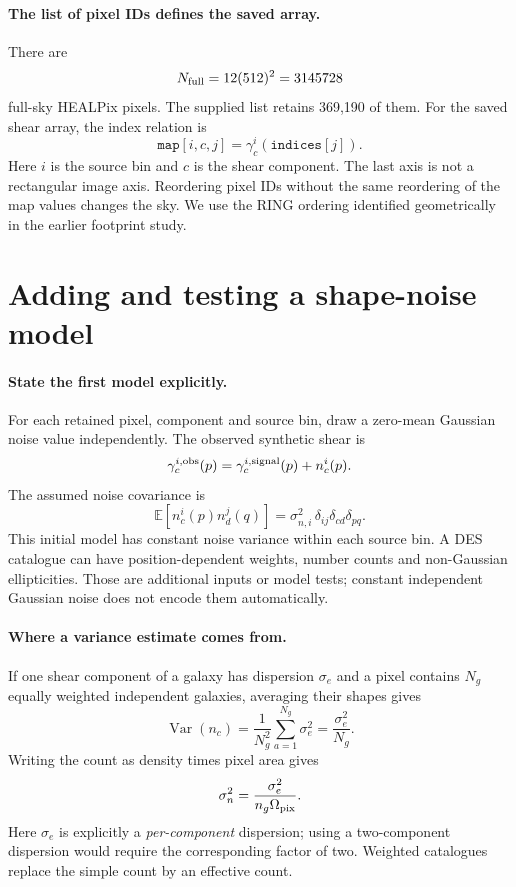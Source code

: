 \documentclass[11pt]{article}
\newcommand{\E}{\mathbb E}
\newcommand{\Var}{\operatorname{Var}}
\begin{document}
\paragraph{The list of pixel IDs defines the saved array.}
There are
\begin{equation}
 N_{\rm full}=12(512)^2=3145728
\end{equation}
full-sky HEALPix pixels. The supplied list retains 369,190 of them.
For the saved shear array, the index relation is
\begin{equation}
 \texttt{map}[i,c,j]=\gamma_c^i(\texttt{indices}[j]).
\end{equation}
Here $i$ is the source bin and $c$ is the shear component. The last
axis is not a rectangular image axis. Reordering pixel IDs without the
same reordering of the map values changes the sky. We use the RING ordering
identified geometrically in the earlier footprint study.

\section{Adding and testing a shape-noise model}
\paragraph{State the first model explicitly.}
For each retained pixel, component and source bin, draw a zero-mean
Gaussian noise value independently. The observed synthetic shear is
\begin{equation}
 \gamma^{i,\rm obs}_c(p)=\gamma^{i,\rm signal}_c(p)+n^i_c(p).
\end{equation}
The assumed noise covariance is
\begin{equation}
 \E[n^i_c(p)n^j_d(q)]=\sigma_{n,i}^2\,
                \delta_{ij}\delta_{cd}\delta_{pq}.
\end{equation}
This initial model has constant noise variance within each source bin.
A DES catalogue can have position-dependent weights, number counts and
non-Gaussian ellipticities. Those are additional inputs or model tests;
constant independent Gaussian noise does not encode them automatically.

\paragraph{Where a variance estimate comes from.}
If one shear component of a galaxy has dispersion $\sigma_e$ and a pixel
contains $N_g$ equally weighted independent galaxies, averaging their
shapes gives
\begin{equation}
 \Var(n_c)=\frac1{N_g^2}\sum_{a=1}^{N_g}\sigma_e^2
          =\frac{\sigma_e^2}{N_g}.
\end{equation}
Writing the count as density times pixel area gives
\begin{equation}
 \sigma_{n}^2=\frac{\sigma_e^2}{n_g\Omega_{\rm pix}}.
\end{equation}
Here $\sigma_e$ is explicitly a \emph{per-component} dispersion; using a
two-component dispersion would require the corresponding factor of two.
Weighted catalogues replace the simple count by an effective count.
\end{document}
